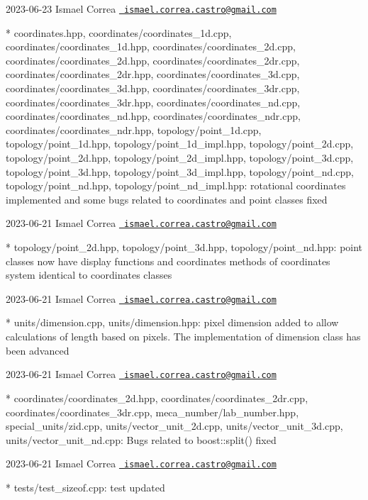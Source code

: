  2023-\/06-\/23 Ismael Correa \href{mailto:ismael.correa.castro@gmail.com}{\texttt{ ismael.\+correa.\+castro@gmail.\+com}} \begin{DoxyVerb}* coordinates.hpp, coordinates/coordinates_1d.cpp,
coordinates/coordinates_1d.hpp, coordinates/coordinates_2d.cpp,
coordinates/coordinates_2d.hpp, coordinates/coordinates_2dr.cpp,
coordinates/coordinates_2dr.hpp, coordinates/coordinates_3d.cpp,
coordinates/coordinates_3d.hpp, coordinates/coordinates_3dr.cpp,
coordinates/coordinates_3dr.hpp, coordinates/coordinates_nd.cpp,
coordinates/coordinates_nd.hpp, coordinates/coordinates_ndr.cpp,
coordinates/coordinates_ndr.hpp, topology/point_1d.cpp,
topology/point_1d.hpp, topology/point_1d_impl.hpp,
topology/point_2d.cpp, topology/point_2d.hpp,
topology/point_2d_impl.hpp, topology/point_3d.cpp,
topology/point_3d.hpp, topology/point_3d_impl.hpp,
topology/point_nd.cpp, topology/point_nd.hpp,
topology/point_nd_impl.hpp: rotational coordinates implemented and
some bugs related to coordinates and point classes fixed
\end{DoxyVerb}
 2023-\/06-\/21 Ismael Correa \href{mailto:ismael.correa.castro@gmail.com}{\texttt{ ismael.\+correa.\+castro@gmail.\+com}} \begin{DoxyVerb}* topology/point_2d.hpp, topology/point_3d.hpp,
topology/point_nd.hpp: point classes now have display functions and
coordinates methods of coordinates system identical to coordinates
classes
\end{DoxyVerb}
 2023-\/06-\/21 Ismael Correa \href{mailto:ismael.correa.castro@gmail.com}{\texttt{ ismael.\+correa.\+castro@gmail.\+com}} \begin{DoxyVerb}* units/dimension.cpp, units/dimension.hpp: pixel dimension added to
allow calculations of length based on pixels. The implementation of
dimension class has been advanced
\end{DoxyVerb}
 2023-\/06-\/21 Ismael Correa \href{mailto:ismael.correa.castro@gmail.com}{\texttt{ ismael.\+correa.\+castro@gmail.\+com}} \begin{DoxyVerb}* coordinates/coordinates_2d.hpp, coordinates/coordinates_2dr.cpp,
coordinates/coordinates_3dr.cpp, meca_number/lab_number.hpp,
special_units/zid.cpp, units/vector_unit_2d.cpp,
units/vector_unit_3d.cpp, units/vector_unit_nd.cpp: Bugs related to
boost::split() fixed
\end{DoxyVerb}
 2023-\/06-\/21 Ismael Correa \href{mailto:ismael.correa.castro@gmail.com}{\texttt{ ismael.\+correa.\+castro@gmail.\+com}} \begin{DoxyVerb}* tests/test_sizeof.cpp: test updated
\end{DoxyVerb}
